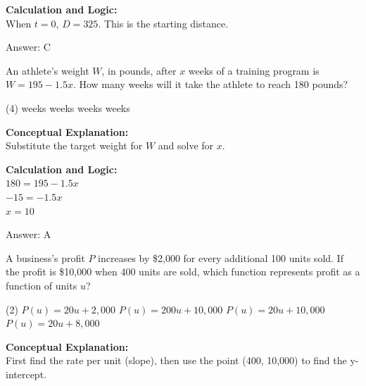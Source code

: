 \documentclass[11pt,paper=a4,answers]{exam}
\begin{document}
\begin{questions}
\begin{solution}
\vspace{10pt}
\textbf{Calculation and Logic:} \\
When $t = 0$, $D = 325$. This is the starting distance.

\vspace{15pt}
Answer: \colorbox{yellow!100}{C}
\end{solution}

\vspace{20pt}

\question
An athlete's weight $W$, in pounds, after $x$ weeks of a training program is $W = 195 - 1.5x$. How many weeks will it take the athlete to reach 180 pounds?
\begin{tasks}(4)
     weeks
     weeks
     weeks
     weeks
\end{tasks}

\begin{solution}
\textbf{Conceptual Explanation:} \\
Substitute the target weight for $W$ and solve for $x$.

\vspace{10pt}
\textbf{Calculation and Logic:} \\
$180 = 195 - 1.5x$ \\
$-15 = -1.5x$ \\
$x = 10$

\vspace{15pt}
Answer: \colorbox{yellow!100}{A}
\end{solution}

\vspace{20pt}

\question
A business's profit $P$ increases by \$2,000 for every additional 100 units sold. If the profit is \$10,000 when 400 units are sold, which function represents profit as a function of units $u$?
\begin{tasks}(2)
    \task $P(u) = 20u + 2,000$
    \task $P(u) = 200u + 10,000$
    \task $P(u) = 20u + 10,000$
    \task $P(u) = 20u + 8,000$
\end{tasks}

\begin{solution}
\textbf{Conceptual Explanation:} \\
First find the rate per unit (slope), then use the point (400, 10,000) to find the y-intercept.


\end{solution}
\end{questions}
\end{document}
